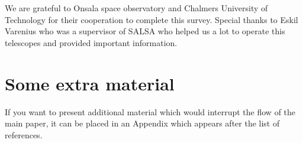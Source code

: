 \documentclass[fleqn,usenatbib]{mnras}
\begin{document}
We are grateful to Onsala space observatory and Chalmers University of Technology for their cooperation to complete this survey. Special thanks to Eskil Varenius who was a supervisor of SALSA who helped us a lot to operate this telescopes and provided important information.







%



\appendix

\section{Some extra material}

If you want to present additional material which would interrupt the flow of the main paper,
it can be placed in an Appendix which appears after the list of references.



\bsp	%
\label{lastpage}
\end{document}
